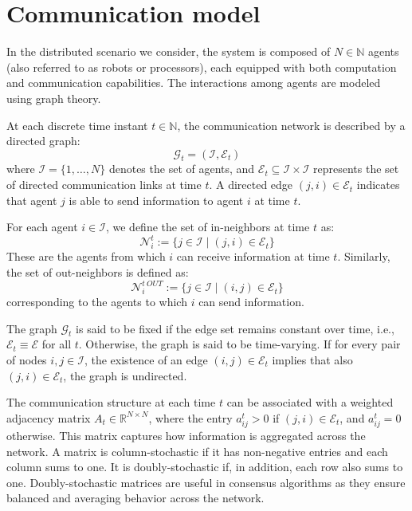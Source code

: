 \section*{Communication model}
In the distributed scenario we consider, the system is composed of $N \in \mathbb{N}$ agents (also referred to as robots or processors), each equipped with both computation and communication capabilities. The interactions among agents are modeled using graph theory.

At each discrete time instant $t \in \mathbb{N}$, the communication network is described by a directed graph:
\[
\mathcal{G}_t = (\mathcal{I}, \mathcal{E}_t)
\]
where $\mathcal{I} = \{1, \dots, N\}$ denotes the set of agents, and $\mathcal{E}_t \subseteq \mathcal{I} \times \mathcal{I}$ represents the set of directed communication links at time $t$. A directed edge $(j, i) \in \mathcal{E}_t$ indicates that agent $j$ is able to send information to agent $i$ at time $t$.

\vspace{0.5em}

For each agent $i \in \mathcal{I}$, we define the set of in-neighbors at time $t$ as:
\[
\mathcal{N}_i^t := \{ j \in \mathcal{I} \mid (j, i) \in \mathcal{E}_t \}
\]
These are the agents from which $i$ can receive information at time $t$. Similarly, the set of out-neighbors is defined as:
\[
\mathcal{N}_i^{t \ OUT}  := \{ j \in \mathcal{I} \mid (i, j) \in \mathcal{E}_t \}
\]
corresponding to the agents to which $i$ can send information.

\vspace{0.5em}

The graph $\mathcal{G}_t$ is said to be fixed if the edge set remains constant over time, i.e., $\mathcal{E}_t \equiv \mathcal{E}$ for all $t$. Otherwise, the graph is said to be time-varying. If for every pair of nodes $i, j \in \mathcal{I}$, the existence of an edge $(i, j) \in \mathcal{E}_t$ implies that also $(j, i) \in \mathcal{E}_t$, the graph is undirected.

The communication structure at each time $t$ can be associated with a weighted adjacency matrix $A_t \in \mathbb{R}^{N \times N}$, where the entry $a_{ij}^t > 0$ if $(j, i) \in \mathcal{E}_t$, and $a_{ij}^t = 0$ otherwise. This matrix captures how information is aggregated across the network. A matrix is column-stochastic if it has non-negative entries and each column sums to one. It is doubly-stochastic if, in addition, each row also sums to one. Doubly-stochastic matrices are useful in consensus algorithms as they ensure balanced and averaging behavior across the network.

